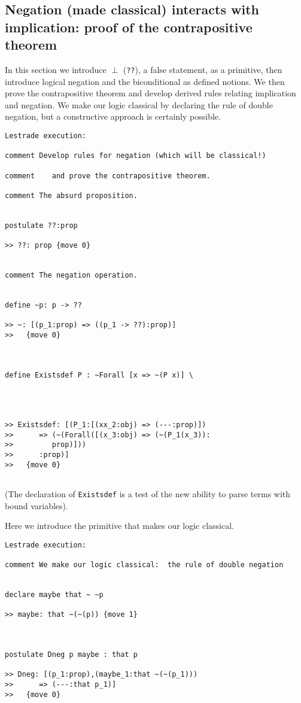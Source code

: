 \documentclass[12pt]{article}
\begin{document}
\subsection{Negation (made classical) interacts with implication:  proof of the contrapositive theorem}

In this section we introduce $\perp$ ({\tt ??}), a false statement, as a primitive, then introduce logical negation and the biconditional as defined notions.  We then prove the contrapositive theorem and develop derived rules relating implication and negation.  We make our logic classical by declaring the rule of double negation, but a constructive approach is certainly possible.

\begin{verbatim}Lestrade execution:

comment Develop rules for negation (which will be classical!) 

comment    and prove the contrapositive theorem.

comment The absurd proposition.


postulate ??:prop

>> ??: prop {move 0}


comment The negation operation.


define ~p: p -> ??

>> ~: [(p_1:prop) => ((p_1 -> ??):prop)]
>>   {move 0}



define Existsdef P : ~Forall [x => ~(P x)] \
   



>> Existsdef: [(P_1:[(xx_2:obj) => (---:prop)])
>>      => (~(Forall([(x_3:obj) => (~(P_1(x_3)):
>>         prop)]))
>>      :prop)]
>>   {move 0}


\end{verbatim}

(The declaration of {\tt Existsdef} is a test of the new ability to parse terms with bound variables).

Here we introduce the primitive that makes our logic classical.



\begin{verbatim}Lestrade execution:

comment We make our logic classical:  the rule of double negation


declare maybe that ~ ~p

>> maybe: that ~(~(p)) {move 1}



postulate Dneg p maybe : that p

>> Dneg: [(p_1:prop),(maybe_1:that ~(~(p_1)))
>>      => (---:that p_1)]
>>   {move 0}


\end{verbatim}
\end{document}
